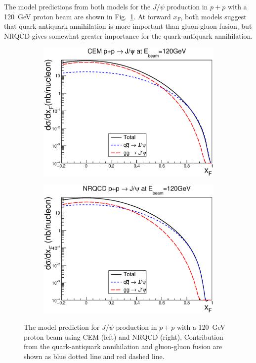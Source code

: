 \documentclass[10pt,a4paper,final]{article}
\begin{document}
The model predictions from both models for the $J/\psi$ production in $p+p$ with a \SI{120}{\GeV}
proton beam are shown in Fig.~\ref{fig:jpsi_theory}. At forward $x_F$, both models suggest
that quark-antiquark annihilation is more important than gluon-gluon fusion, but NRQCD
gives somewhat greater importance for the quark-antiquark annihilation.
\begin{figure}[h!]
	\centering
	\begin{subfigure}{0.45\linewidth}
		\includegraphics[width=0.9\linewidth]{pp_norm_cs_NLO_pp}
	\end{subfigure}
	\begin{subfigure}{0.45\linewidth}
		\includegraphics[width=0.9\linewidth]{jpsi_cs_pp}
	\end{subfigure}
	\caption{The model prediction for $J/\psi$ production in $p+p$ with a \SI{120}{\GeV}
		proton beam using CEM (left) and NRQCD (right). Contribution from the
		quark-antiquark annihilation and gluon-gluon fusion are shown as blue dotted line
		and red dashed line.}
	\label{fig:jpsi_theory}
\end{figure}
\end{document}
